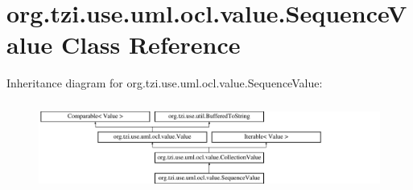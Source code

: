 \hypertarget{classorg_1_1tzi_1_1use_1_1uml_1_1ocl_1_1value_1_1_sequence_value}{\section{org.\-tzi.\-use.\-uml.\-ocl.\-value.\-Sequence\-Value Class Reference}
\label{classorg_1_1tzi_1_1use_1_1uml_1_1ocl_1_1value_1_1_sequence_value}
}
Inheritance diagram for org.\-tzi.\-use.\-uml.\-ocl.\-value.\-Sequence\-Value\-:\begin{figure}[H]
\begin{center}
\leavevmode
\includegraphics[height=2.974767cm]{classorg_1_1tzi_1_1use_1_1uml_1_1ocl_1_1value_1_1_sequence_value}
\end{center}
\end{figure}
